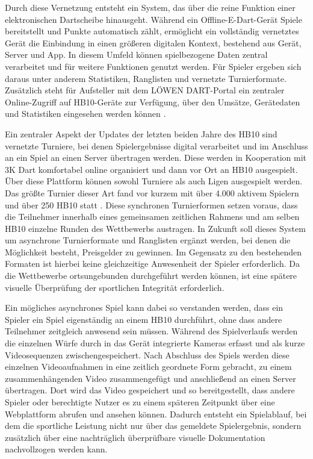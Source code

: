 Durch diese Vernetzung entsteht ein System, 
das über die reine Funktion einer elektronischen Dartscheibe hinausgeht. Während ein Offline-E-Dart-Gerät Spiele bereitstellt und Punkte automatisch zählt, ermöglicht ein vollständig vernetztes Gerät die Einbindung in einen größeren digitalen Kontext, 
bestehend aus Gerät, Server und App. In diesem Umfeld können spielbezogene Daten zentral verarbeitet und für weitere Funktionen genutzt werden. Für Spieler ergeben sich daraus unter anderem Statistiken, Ranglisten und vernetzte Turnierformate.  
Zusätzlich steht für Aufsteller mit dem LÖWEN DART-Portal ein zentraler Online-Zugriff auf HB10-Geräte zur Verfügung, über den Umsätze, Gerätedaten und Statistiken eingesehen werden können \cite{lwenentertainment_2026_lwen}. 

Ein zentraler Aspekt der Updates der letzten beiden Jahre des HB10 sind vernetzte Turniere, bei denen Spielergebnisse digital verarbeitet und im Anschluss an ein Spiel an einen Server übertragen werden. 
Diese werden in Kooperation mit 3K Dart \cite{mützner_2026} komfortabel online organisiert und dann vor Ort an HB10 ausgespielt. Über diese Plattform können sowohl Turniere als auch Ligen ausgespielt werden. 
Das größte Turnier dieser Art fand vor kurzem mit über 4.000 aktivem Spielern und über 250 HB10 statt \cite{2026dart}. Diese synchronen Turnierformen setzen voraus, dass die Teilnehmer innerhalb eines gemeinsamen zeitlichen Rahmens und am selben HB10 einzelne Runden des Wettbewerbs austragen. 
In Zukunft soll dieses System um asynchrone Turnierformate und Ranglisten ergänzt werden, bei denen die Möglichkeit besteht, Preisgelder zu gewinnen. Im Gegensatz zu den bestehenden Formaten ist hierbei keine gleichzeitige Anwesenheit der Spieler erforderlich. 
Da die Wettbewerbe ortsungebunden durchgeführt werden können, ist eine spätere visuelle Überprüfung der sportlichen Integrität erforderlich. 

Ein mögliches asynchrones Spiel kann dabei so verstanden werden, dass ein Spieler ein Spiel eigenständig an einem HB10 durchführt, ohne dass andere Teilnehmer zeitgleich anwesend sein müssen. Während des Spielverlaufs werden die einzelnen Würfe 
durch in das Gerät integrierte Kameras erfasst und als kurze Videosequenzen zwischengespeichert. Nach Abschluss des Spiels werden diese einzelnen Videoaufnahmen in eine zeitlich geordnete Form gebracht, zu einem zusammenhängenden Video zusammengefügt und anschließend an einen Server übertragen.
Dort wird das Video gespeichert und so bereitgestellt, dass andere Spieler oder berechtigte Nutzer es zu einem späteren Zeitpunkt über eine Webplattform abrufen und ansehen können. Dadurch entsteht ein Spielablauf, bei dem die sportliche Leistung nicht nur über das gemeldete Spielergebnis, 
sondern zusätzlich über eine nachträglich überprüfbare visuelle Dokumentation nachvollzogen werden kann. 

